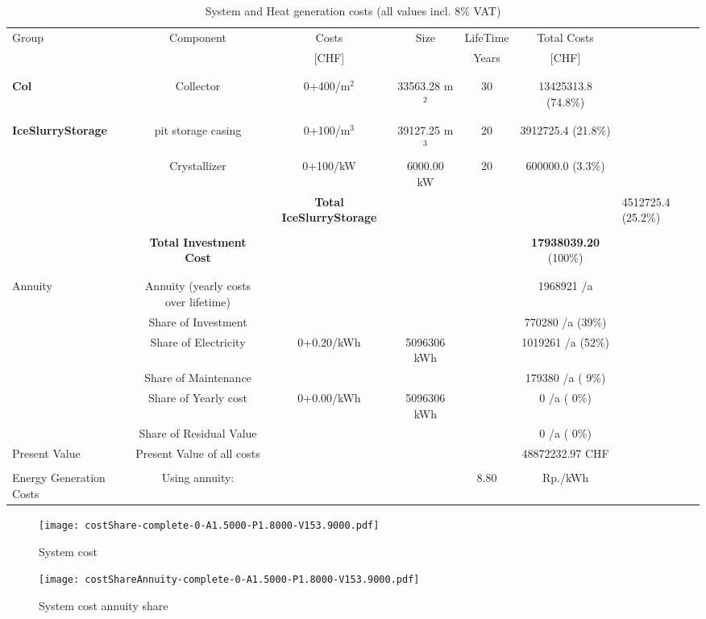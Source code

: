\documentclass[english]{SPFShortReport}
\begin{document}
\begin{table}[!ht]
\centering
\caption{System and Heat generation costs (all values incl. 8$\%$ VAT) }
\begin{adjustbox}{max width =\textwidth}
\begin{tabular}{l | c c c c c } 
\hline
\hline
Group &Component &Costs &Size &LifeTime &Total Costs \\ 
 & &[CHF] & &Years &[CHF]\\ 
\hline
\\
\hline \\
\textbf{Col} & Collector & 0+400/m$^2$ & 33563.28 m$^2$ & 30 & 13425313.8 (74.8\%) \\
\hline \\
\hline \\
\textbf{IceSlurryStorage} & pit storage casing & 0+100/m$^3$ & 39127.25 m$^3$ & 20 & 3912725.4 (21.8\%) \\
 & Crystallizer & 0+100/kW & 6000.00 kW & 20 & 600000.0 (3.3\%) \\
&
 & \textbf{Total IceSlurryStorage} & & & & 4512725.4 (25.2\%) \\
\hline \\
 & \textbf{Total Investment Cost} & & & & \textbf{17938039.20} (100\%) \\ 
\hline \\ 
\hline \\ 
Annuity & Annuity (yearly costs over lifetime)  &&& & 1968921 /a  \\
 & Share of Investment & &&& 770280 /a (39\%) \\
 & Share of Electricity & 0+0.20/kWh & 5096306 kWh &  & 1019261 /a (52\%)\\
 & Share of Maintenance & &&& 179380 /a ( 9\%)\\ 
 & Share of Yearly cost & 0+0.00/kWh & 5096306 kWh & &  0 /a ( 0\%)\\
 & Share of Residual Value &&& &  0 /a ( 0\%)\\
Present Value  & Present Value of all costs  & &&& 48872232.97 CHF \\
\hline \\ 
 Energy Generation Costs & Using annuity: &&& 8.80 & Rp./kWh \\
\hline
\hline
\end{tabular}
\end{adjustbox}
\label{CostsTable}
\end{table}
\begin{figure}[!htbp]
\begin{center}
\texttt{[image: costShare-complete-0-A1.5000-P1.8000-V153.9000.pdf]}
\caption{System cost}
\label{systemCost}
\end{center}
\end{figure}
\begin{figure}[!htbp]
\begin{center}
\texttt{[image: costShareAnnuity-complete-0-A1.5000-P1.8000-V153.9000.pdf]}
\caption{System cost annuity share}
\label{systemCostannuity}
\end{center}
\end{figure}
\end{document}
